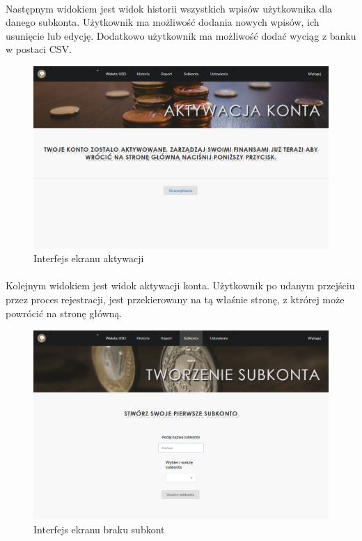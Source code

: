 \documentclass{article}
\begin{document}
\paragraph*{} Następnym widokiem jest widok historii wszystkich wpisów użytkownika dla danego subkonta. Użytkownik ma możliwość dodania nowych wpisów, ich usunięcie lub edycję. Dodatkowo użytkownik ma możliwość dodać wyciąg z banku w postaci CSV.
\begin{figure}[H]
	\hspace*{-3cm}
	\includegraphics[scale=0.6]{assets/aktyw.png}
	\caption[]{Interfejs ekranu aktywacji}
	\label{fig:akty}
\end{figure}
\paragraph*{} Kolejnym widokiem jest widok aktywacji konta. Użytkownik po udanym przejściu przez proces rejestracji, jest przekierowany na tą właśnie stronę, z ktrórej może powrócić na stronę główną.
\begin{figure}[H]
	\hspace*{-3cm}
	\includegraphics[scale=0.6]{assets/braksub.png}
	\caption[]{Interfejs ekranu braku subkont}
	\label{fig:braksub}
\end{figure}
\end{document}
